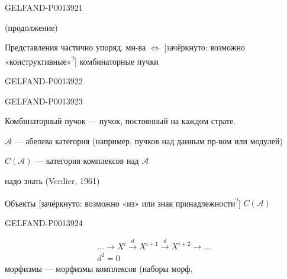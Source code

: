 \begin{GelfandAdjacentEvidence}{GELFAND-P001392}{1}

\quad {} (продолжение)

Представления частично упоряд. мн-ва \(\Longleftrightarrow\)
[зачёркнуто: возможно «конструктивные»\textsuperscript{?}]
комбинаторные пучки

\end{GelfandAdjacentEvidence}
\begin{GelfandAdjacentEvidence}{GELFAND-P001392}{2}



\end{GelfandAdjacentEvidence}
\begin{GelfandAdjacentEvidence}{GELFAND-P001392}{3}


Комбинаторный пучок --- пучок, постоянный на каждом страте.


\(\mathcal A\) --- абелева категория (например, пучков над данным пр-вом или модулей)

\(C(\mathcal A)\) --- категория комплексов над \(\mathcal A\)

надо знать  (Verdier, 1961)

Объекты [зачёркнуто:
возможно «из» или знак принадлежности\textsuperscript{?}]
\(C(\mathcal A)\)


\end{GelfandAdjacentEvidence}
\begin{GelfandAdjacentEvidence}{GELFAND-P001392}{4}

\begin{gather*}
\ldots\longrightarrow X^i\overset{d}{\longrightarrow}X^{i+1}
\overset{d}{\longrightarrow}X^{i+2}\longrightarrow\ldots\\
d^2=0
\end{gather*}
морфизмы --- морфизмы комплексов (наборы морф.
\end{GelfandAdjacentEvidence}
